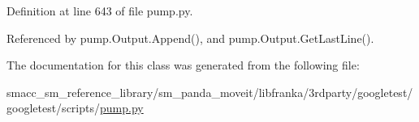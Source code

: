 Definition at line 643 of file pump.\+py.



Referenced by pump.\+Output.\+Append(), and pump.\+Output.\+Get\+Last\+Line().



The documentation for this class was generated from the following file\+:\begin{DoxyCompactItemize}
\item 
smacc\+\_\+sm\+\_\+reference\+\_\+library/sm\+\_\+panda\+\_\+moveit/libfranka/3rdparty/googletest/googletest/scripts/\hyperlink{pump_8py}{pump.\+py}\end{DoxyCompactItemize}
